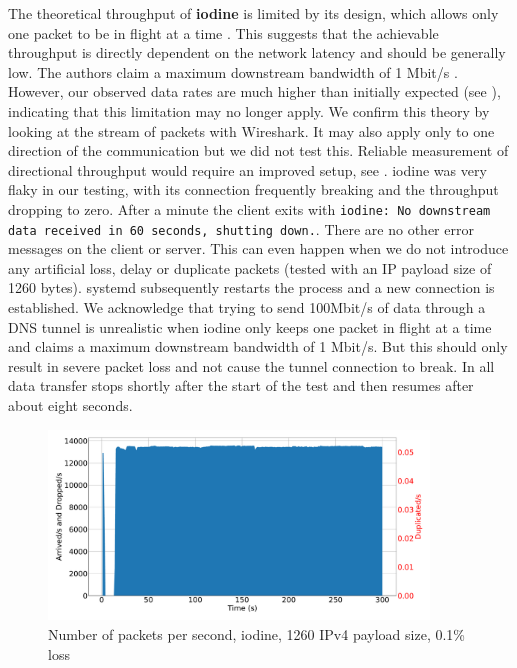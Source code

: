 The theoretical throughput of \textbf{iodine} is limited by its design, which allows only one packet to be in flight at a time \cite{iodine-README}.
This suggests that the achievable throughput is directly dependent on the network latency and should be generally low.
The authors claim a maximum downstream bandwidth of 1 Mbit/s \cite{iodine-homepage}.
However, our observed data rates are much higher than initially expected (see ), indicating that this limitation may no longer apply.
We confirm this theory by looking at the stream of packets with Wireshark.
It may also apply only to one direction of the communication but we did not test this.
Reliable measurement of directional throughput would require an improved setup, see .
iodine was very flaky in our testing, with its connection frequently breaking and the throughput dropping to zero.
After a minute the client exits with \texttt{iodine: No downstream data received in 60 seconds, shutting down.}.
There are no other error messages on the client or server.
This can even happen when we do not introduce any artificial loss, delay or duplicate packets (tested with an IP payload size of 1260 bytes).
systemd subsequently restarts the process and a new connection is established.
We acknowledge that trying to send 100Mbit/s of data through a DNS tunnel is unrealistic when iodine only keeps one packet in flight at a time and claims a maximum downstream bandwidth of 1 Mbit/s.
But this should only result in severe packet loss and not cause the tunnel connection to break.
In  all data transfer stops shortly after the start of the test and then resumes after about eight seconds.
\begin{figure}[tbh]
	\centering
	\includegraphics[draft=false,width=0.9\textwidth]{figures/Graphs/graph-2-iodine-dropout/packet_counts_all.pdf}
	\caption{Number of packets per second, iodine, 1260 IPv4 payload size, 0.1\% loss}
	\label{fig:graph-2-iodine-dropout-packets}
\end{figure}

